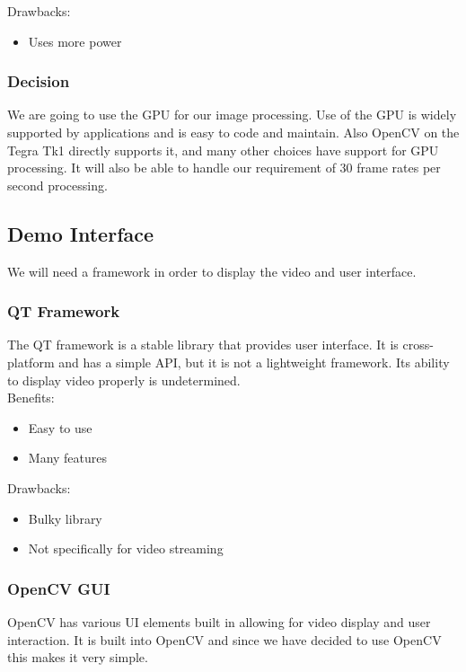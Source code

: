 	Drawbacks:
	\begin{itemize}[leftmargin=2cm,labelindent=2cm]
		\item Uses more power\\
	\end{itemize}
	
	\subsubsection{\textbf{Decision}}
	We are going to use the GPU for our image processing. Use of the GPU is widely supported by applications and is easy to code and maintain. Also OpenCV on the Tegra Tk1 directly supports it, and many other choices have support for GPU processing. It will also be able to handle our requirement of 30 frame rates per second processing.
	
\subsection{Demo Interface}
We will need a framework in order to display the video and user interface.\\
	\subsubsection{QT Framework}
	The QT framework is a stable library that provides user interface.
It is cross-platform and has a simple API, but it is not a lightweight framework. Its ability to display video properly is undetermined.\\
			
	Benefits:
	\begin{itemize}[leftmargin=2cm,labelindent=2cm]
		\item Easy to use
		\item Many features
	\end{itemize}
	
	Drawbacks:
	\begin{itemize}[leftmargin=2cm,labelindent=2cm]
		\item Bulky library
		\item Not specifically for video streaming\\
	\end{itemize}
	
	\subsubsection{OpenCV GUI}
	OpenCV has various UI elements built in allowing for video display and user interaction. It is built into OpenCV and since we have decided to use OpenCV this makes it very simple.\\
		
